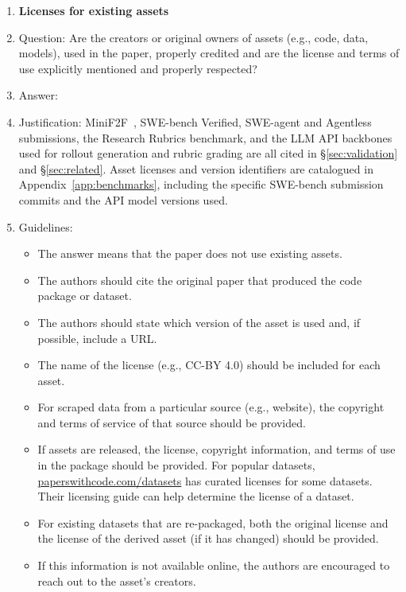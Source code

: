 \begin{enumerate}
\item {\bf Licenses for existing assets}
    \item[] Question: Are the creators or original owners of assets (e.g., code, data, models), used in the paper, properly credited and are the license and terms of use explicitly mentioned and properly respected?
    \item[] Answer: \answerYes{}
    \item[] Justification: MiniF2F~\citep{zheng2022minif2f}, SWE-bench Verified, SWE-agent and Agentless submissions, the Research Rubrics benchmark, and the LLM API backbones used for rollout generation and rubric grading are all cited in \S\ref{sec:validation} and \S\ref{sec:related}. Asset licenses and version identifiers are catalogued in Appendix~\ref{app:benchmarks}, including the specific SWE-bench submission commits and the API model versions used.
    \item[] Guidelines:
    \begin{itemize}
        \item The answer \answerNA{} means that the paper does not use existing assets.
        \item The authors should cite the original paper that produced the code package or dataset.
        \item The authors should state which version of the asset is used and, if possible, include a URL.
        \item The name of the license (e.g., CC-BY 4.0) should be included for each asset.
        \item For scraped data from a particular source (e.g., website), the copyright and terms of service of that source should be provided.
        \item If assets are released, the license, copyright information, and terms of use in the package should be provided. For popular datasets, \url{paperswithcode.com/datasets} has curated licenses for some datasets. Their licensing guide can help determine the license of a dataset.
        \item For existing datasets that are re-packaged, both the original license and the license of the derived asset (if it has changed) should be provided.
        \item If this information is not available online, the authors are encouraged to reach out to the asset's creators.
    \end{itemize}


\end{enumerate}
